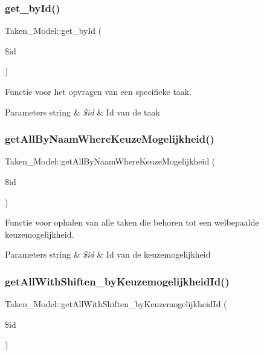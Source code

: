\subsubsection{\texorpdfstring{get\+\_\+by\+Id()}{get\_byId()}}
{\footnotesize\ttfamily Taken\+\_\+\+Model\+::get\+\_\+by\+Id (\begin{DoxyParamCaption}\item[{}]{\$id }\end{DoxyParamCaption})}

Functie voor het opvragen van een specifieke taak. 
\begin{DoxyParams}[1]{Parameters}
string & {\em \$id} & Id van de taak \\
\hline
\end{DoxyParams}
\mbox{\label{class_taken___model_aee432ed4b391407df1bf5d8c4973e5fa}} 
\subsubsection{\texorpdfstring{get\+All\+By\+Naam\+Where\+Keuze\+Mogelijkheid()}{getAllByNaamWhereKeuzeMogelijkheid()}}
{\footnotesize\ttfamily Taken\+\_\+\+Model\+::get\+All\+By\+Naam\+Where\+Keuze\+Mogelijkheid (\begin{DoxyParamCaption}\item[{}]{\$id }\end{DoxyParamCaption})}

Functie voor ophalen van alle taken die behoren tot een welbepaalde keuzemogelijkheid. 
\begin{DoxyParams}[1]{Parameters}
string & {\em \$id} & Id van de keuzemogelijkheid \\
\hline
\end{DoxyParams}
\mbox{\label{class_taken___model_a1b4e18ac99960b20467b3b3cbaa817b4}} 
\subsubsection{\texorpdfstring{get\+All\+With\+Shiften\+\_\+by\+Keuzemogelijkheid\+Id()}{getAllWithShiften\_byKeuzemogelijkheidId()}}
{\footnotesize\ttfamily Taken\+\_\+\+Model\+::get\+All\+With\+Shiften\+\_\+by\+Keuzemogelijkheid\+Id (\begin{DoxyParamCaption}\item[{}]{\$id }\end{DoxyParamCaption})}

